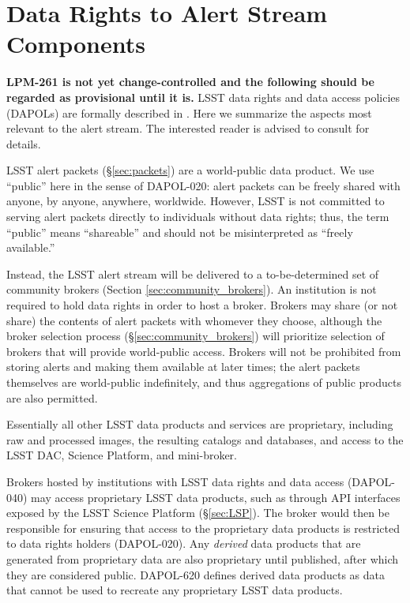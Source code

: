 \section{Data Rights to Alert Stream Components}\label{sec:data_rights}

\textbf{LPM-261 is not yet change-controlled and the following should be regarded as provisional until it is.}
LSST data rights and data access policies (DAPOLs) are formally described in . 
Here we summarize the aspects most relevant to the alert stream. 
The interested reader is advised to consult  for details.

LSST alert packets (\S \ref{sec:packets}) are a world-public data product.
We use ``public'' here in the sense of DAPOL-020:  alert packets can be freely shared with anyone, by anyone, anywhere, worldwide.
However, LSST is not committed to serving alert packets directly to individuals without data rights;
thus, the term ``public'' means ``shareable'' and should not be misinterpreted as ``freely available.''

Instead, the LSST alert stream will be delivered to a to-be-determined set of community brokers (Section \ref{sec:community_brokers}).
An institution is not required to hold data rights in order to host a broker.
Brokers may share (or not share) the contents of alert packets with whomever they choose,
although the broker selection process (\S \ref{sec:community_brokers}) will prioritize selection of brokers that will provide world-public access.
Brokers will not be prohibited from storing alerts and making them available at later times;
the alert packets themselves are world-public indefinitely, and thus aggregations of public products are also permitted.

Essentially all other LSST data products and services are proprietary, including raw and processed images, the resulting catalogs and databases, and access to the LSST DAC, Science Platform, and mini-broker.

Brokers hosted by institutions with LSST data rights and data access (DAPOL-040) may access proprietary LSST data products, such as through API interfaces exposed by the LSST Science Platform (\S \ref{sec:LSP}).
The broker would then be responsible for ensuring that access to the proprietary data products is restricted to data rights holders (DAPOL-020).
Any \textit{derived} data products that are generated from proprietary data are also proprietary until published, after which they are considered public. 
DAPOL-620 defines derived data products as data that cannot be used to recreate any proprietary LSST data products.

